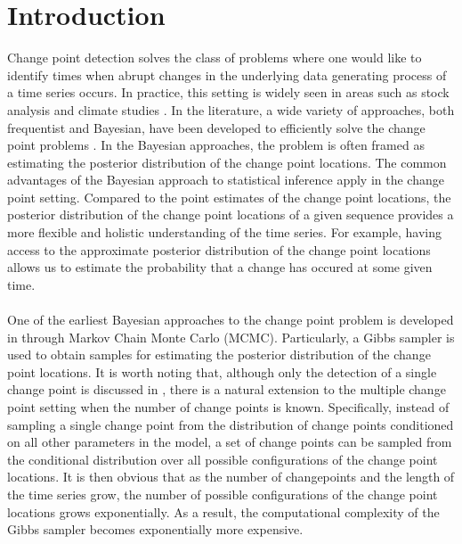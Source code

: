 

\section{Introduction}

Change point detection solves the class of problems where one would like to identify times when abrupt changes in the underlying data generating process of a time series occurs. In practice, this setting is widely seen in areas such as stock analysis and climate studies \cite{chen1997testing,elsner2004detecting}. In the literature, a wide variety of approaches, both frequentist and Bayesian, have been developed to efficiently solve the change point problems \cite{killick2012optimal,carlin1992hierarchical}. In the Bayesian approaches, the problem is often framed as estimating the posterior distribution of the change point locations. The common advantages of the Bayesian approach to statistical inference apply in the change point setting. Compared to the point estimates of the change point locations, the posterior distribution of the change point locations of a given sequence provides a more flexible and holistic understanding of the time series. For example, having access to the approximate posterior distribution of the change point locations allows us to estimate the probability that a change has occured at some given time.\\\\
One of the earliest Bayesian approaches to the change point problem is developed in \cite{carlin1992hierarchical} through Markov Chain Monte Carlo (MCMC). Particularly, a Gibbs sampler is used to obtain samples for estimating the posterior distribution of the change point locations. It is worth noting that, although only the detection of a single change point is discussed in \cite{carlin1992hierarchical}, there is a natural extension to the multiple change point setting when the number of change points is known. Specifically, instead of sampling a single change point from the distribution of change points conditioned on all other parameters in the model, a set of change points can be sampled from the conditional distribution over all possible configurations of the change point locations. It is then obvious that as the number of changepoints and the length of the time series grow, the number of possible configurations of the change point locations grows exponentially. As a result, the computational complexity of the Gibbs sampler becomes exponentially more expensive.\\\\
